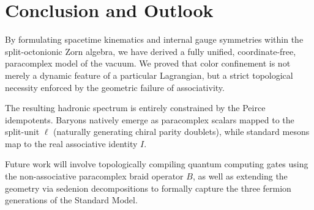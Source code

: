 \documentclass[11pt,a4paper]{article}
\begin{document}
\section{Conclusion and Outlook}

By formulating spacetime kinematics and internal gauge symmetries within the split-octonionic Zorn algebra, we have derived a fully unified, coordinate-free, paracomplex model of the vacuum. We proved that color confinement is not merely a dynamic feature of a particular Lagrangian, but a strict topological necessity enforced by the geometric failure of associativity.

The resulting hadronic spectrum is entirely constrained by the Peirce idempotents. Baryons natively emerge as paracomplex scalars mapped to the split-unit $\ell$ (naturally generating chiral parity doublets), while standard mesons map to the real associative identity $I$.

Future work will involve topologically compiling quantum computing gates using the non-associative paracomplex braid operator $B$, as well as extending the geometry via sedenion decompositions to formally capture the three fermion generations of the Standard Model.
\end{document}
